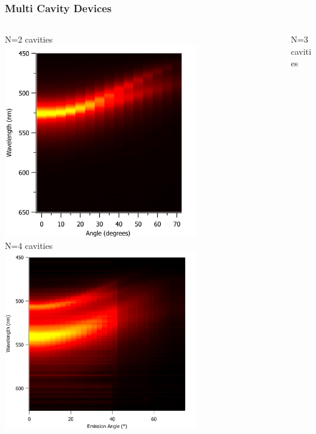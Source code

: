 \documentclass{beamer}
\begin{document}
        \begin{frame}
            \frametitle{Multi Cavity Devices}
            \begin{columns}
				\begin{column}{0.5\textwidth}
					\centering
					N=2 cavities\\
					\includegraphics[width=0.7\textwidth]{images/n2_heatmap.png}\\
					N=4 cavities\\
					\includegraphics[width=0.7\textwidth]{images/n4_heatmap.pdf}
				\end{column}
				\begin{column}{0.5\textwidth}
					\centering
					N=3 cavities\\

\end{column}
\end{columns}
\end{frame}
\end{document}
